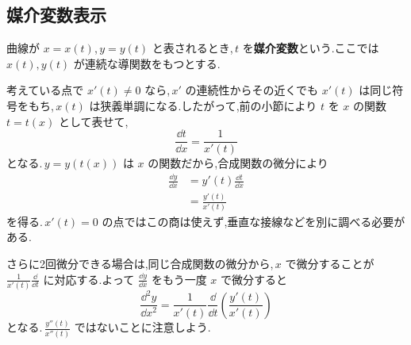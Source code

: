 \subsection{媒介変数表示}
曲線が $x=x(t)$,\,$y=y(t)$ と表されるとき,\,$t$ を\textbf{媒介変数}という.ここでは $x(t),y(t)$ が連続な導関数をもつとする.

考えている点で $x'(t)\ne0$ なら,\,$x'$ の連続性からその近くでも $x'(t)$ は同じ符号をもち,\,$x(t)$ は狭義単調になる.したがって,前の小節により $t$ を $x$ の関数 $t=t(x)$ として表せて,
\[
 \frac{\dd t}{\dd x}=\frac1{x'(t)}
\]
となる.\,$y=y(t(x))$ は $x$ の関数だから,合成関数の微分により
\begin{align*}
 \frac{\dd y}{\dd x}
 &=y'(t)\frac{\dd t}{\dd x}\\
 &=\frac{y'(t)}{x'(t)}
\end{align*}
を得る.\,$x'(t)=0$ の点ではこの商は使えず,垂直な接線などを別に調べる必要がある.

さらに2回微分できる場合は,同じ合成関数の微分から,\,$x$ で微分することが $\frac1{x'(t)}\frac{\dd}{\dd t}$ に対応する.よって $\frac{\dd y}{\dd x}$ をもう一度 $x$ で微分すると
\[
 \frac{\dd^2y}{\dd x^2}
 =\frac1{x'(t)}\frac{\dd}{\dd t}
   \left(\frac{y'(t)}{x'(t)}\right)
\]
となる.\,$\frac{y''(t)}{x''(t)}$ ではないことに注意しよう.

